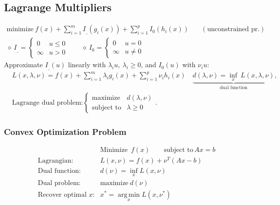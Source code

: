 \documentclass[a4paper,11pt,landscape]{article}
\newcommand{\argmin}{\operatorname*{arg\,min}}
\begin{document}
\begin{multicols}{3}
\subsection{Lagrange Multipliers}
\begin{align*}
 \text{minimize}\ f(x)+ \sum_{i=1}^m I_\_(g_i(x)) +\sum_{i=1}^p I_0(h_i(x))
 &\quad (\text{unconstrained pr.})\\
 \diamond\ I_\_ = \begin{cases}
         0 & u \leq 0\\
         \infty & u > 0 
        \end{cases}
        \qquad \diamond\ 
        I_0 = 
        \begin{cases}
         0 & u= 0\\
         \infty & u\neq 0
        \end{cases}
\end{align*}
Approximate $I_\_(u)$ linearly with $\lambda_iu,\ \lambda_i\geq 0$, and $I_0(u)$ with $\nu_i u$:
\begin{align*}
 &L(x,\lambda, \nu) = f(x) + \sum_{i=1}^m \lambda_i g_i(x) +\sum_{i=1}^p \nu_i h_i(x)\quad \underbrace{d(\lambda, \nu) = \inf_x\ L(x,\lambda,\nu)}_{\text{dual function}},\\
 &\text{Lagrange dual problem:} 
 \begin{cases}
  \text{maximize} & d(\lambda, \nu)\\
  \text{subject to} & \lambda \geq 0
 \end{cases}.
\end{align*}
\subsubsection{Convex Optimization Problem}
\begin{align*}
 &\text{Minimize }\, f(x) \qquad \text{subject to}\, Ax = b\\
 \text{Lagrangian: }& L(x,\nu) = f(x) + \nu^T(Ax-b)\\
 \text{Dual function: }& d(\nu) = \inf_x L(x, \nu)\\
 \text{Dual problem: }& \text{maximize}\ d(\nu)\\
 \text{Recover optimal $x$:}& x^* = \argmin_x L(x,\nu^*)
\end{align*}

\end{multicols}
\end{document}
